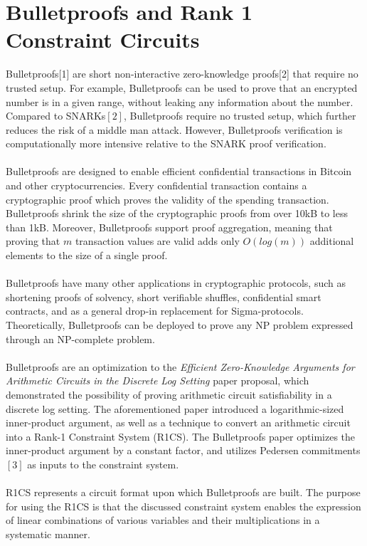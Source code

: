 \documentclass{article}
\begin{document}
\section{Bulletproofs and Rank 1 Constraint Circuits} 
Bulletproofs[1] are short non-interactive zero-knowledge proofs[2] that require no trusted setup. For example, Bulletproofs can be used to prove that an encrypted number is in a given range, without leaking any information about the number. Compared to SNARKs$[2]$, Bulletproofs require no trusted setup, which further reduces the risk of a middle man attack. However, Bulletproofs verification is computationally more intensive relative to the SNARK proof verification.\\\\
Bulletproofs are designed to enable efficient confidential transactions in Bitcoin and other cryptocurrencies. Every confidential transaction contains a cryptographic proof which proves the validity of the spending transaction. Bulletproofs shrink the size of the cryptographic proofs from over 10kB to less than 1kB. Moreover, Bulletproofs support proof aggregation, meaning that proving that $m$ transaction values are valid adds only $O(log(m))$ additional elements to the size of a single proof.\\\\
Bulletproofs have many other applications in cryptographic protocols, such as shortening proofs of solvency, short verifiable shuffles, confidential smart contracts, and as a general drop-in replacement for Sigma-protocols. Theoretically, Bulletproofs can be deployed to prove any NP problem expressed through an NP-complete problem.\\\\
Bulletproofs are an optimization to the \emph{Efficient Zero-Knowledge Arguments for
Arithmetic Circuits in the Discrete Log Setting} paper proposal, which demonstrated the possibility of proving arithmetic circuit satisfiability in a discrete log setting. The aforementioned paper introduced a logarithmic-sized inner-product argument, as well as a technique to convert an arithmetic circuit into a Rank-1 Constraint System (R1CS). The Bulletproofs paper optimizes the inner-product argument by a constant factor, and utilizes Pedersen commitments$[3]$ as inputs to the constraint system.\\\\
R1CS represents a circuit format upon which Bulletproofs are built. The purpose for using the R1CS is that the discussed constraint system enables the expression of linear combinations of various variables and their multiplications in a systematic manner.\\
\end{document}

